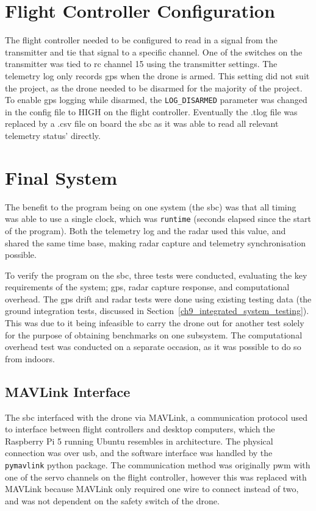 \section{Flight Controller Configuration}
\label{sec:obj4-fc-config}

The flight controller needed to be configured to read in a signal from the transmitter and tie that signal to a specific channel. One of the switches on the transmitter was tied to \gls{rc} channel 15 using the transmitter settings. The telemetry log only records \gls{gps} when the drone is armed. This setting did not suit the project, as the drone needed to be disarmed for the majority of the project. To enable \gls{gps} logging while disarmed, the \texttt{LOG\_DISARMED} parameter was changed in the config file to HIGH on the flight controller. Eventually the .tlog file was replaced by a .csv file on board the \gls{sbc} as it was able to read all relevant telemetry status' directly. 


\section{Final System}
\label{sec:obj4-final-system}

The benefit to the program being on one system (the \gls{sbc}) was that all timing was able to use a single clock, which was \texttt{runtime} (seconds elapsed since the start of the program). Both the telemetry log and the radar used this value, and shared the same time base, making radar capture and telemetry synchronisation possible. 

To verify the program on the \gls{sbc}, three tests were conducted, evaluating the key requirements of the system; \gls{gps}, radar capture response, and computational overhead. The \gls{gps} drift and radar tests were done using existing testing data (the ground integration tests, discussed in Section~\ref{ch9_integrated_system_testing}). This was due to it being infeasible to carry the drone out for another test solely for the purpose of obtaining benchmarks on one subsystem. The computational overhead test was conducted on a separate occasion, as it was possible to do so from indoors. 



\subsection{MAVLink Interface}

The \gls{sbc} interfaced with the drone via MAVLink, a communication protocol used to interface between flight controllers and desktop computers, which the Raspberry Pi 5 running Ubuntu resembles in architecture. The physical connection was over \gls{usb}, and the software interface was handled by the \texttt{pymavlink} python package.  The communication method was originally \gls{pwm} with one of the servo channels on the flight controller, however this was replaced with MAVLink because MAVLink only required one wire to connect instead of two, and was not dependent on the safety switch of the drone. 

